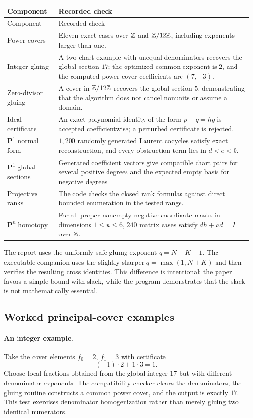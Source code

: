 \begin{longtable}{@{}p{}p{}@{}}
\toprule
Component & Recorded check \\
\midrule
\endfirsthead
\toprule
Component & Recorded check \\
\midrule
\endhead
Power covers & Eleven exact cases over $\mathbb Z$ and $\mathbb Z/12\mathbb Z$, including exponents larger than one. \\
Integer gluing & A two-chart example with unequal denominators recovers the global section $17$; the optimized common exponent is $2$, and the computed power-cover coefficients are $(7,-3)$. \\
Zero-divisor gluing & A cover in $\mathbb Z/12\mathbb Z$ recovers the global section $5$, demonstrating that the algorithm does not cancel nonunits or assume a domain. \\
Ideal certificate & An exact polynomial identity of the form $p-q=hg$ is accepted coefficientwise; a perturbed certificate is rejected. \\
$\mathbf P^1$ normal form & $1{,}200$ randomly generated Laurent cocycles satisfy exact reconstruction, and every obstruction term lies in $d<e<0$. \\
$\mathbf P^1$ global sections & Generated coefficient vectors give compatible chart pairs for several positive degrees and the expected empty basis for negative degrees. \\
Projective ranks & The code checks the closed rank formulas against direct bounded enumeration in the tested range. \\
$\mathbf P^n$ homotopy & For all proper nonempty negative-coordinate masks in dimensions $1\leq n\leq6$, $240$ matrix cases satisfy $dh+hd=I$ over $\mathbb Z$. \\
\bottomrule
\end{longtable}

The report uses the uniformly safe gluing exponent $q=N+K+1$.  The executable companion uses the
slightly sharper $q=\max(1,N+K)$ and then verifies the resulting cross identities.  This difference
is intentional: the paper favors a simple bound with slack, while the program demonstrates that the
slack is not mathematically essential.

\subsection{Worked principal-cover examples}

\paragraph{An integer example.}
Take the cover elements $f_0=2$, $f_1=3$ with certificate
\[
                         (-1)\cdot2+1\cdot3=1.
\]
Choose local fractions obtained from the global integer $17$ but with different denominator
exponents.  The compatibility checker clears the denominators, the gluing routine constructs a
common power cover, and the output is exactly $17$.  This test exercises denominator homogenization
rather than merely gluing two identical numerators.

